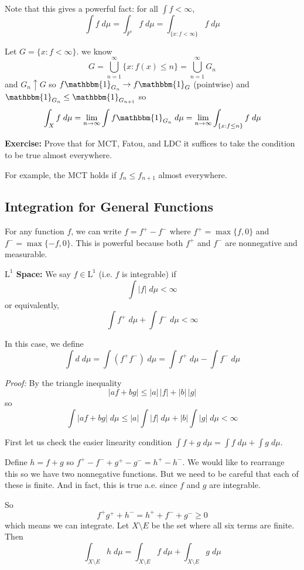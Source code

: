 \documentclass[12pt]{report}
\newcommand{\R}{\mathbb{R}}
\newcommand{\ind}{\mathbbm{1}}
\newcommand{\abs}[1]{\left\vert #1 \right\vert}
\renewcommand{\L}{\text{L}}
\newcommand*{\tbf}[1]{\ifmmode\mathbf{#1}\else\textbf{#1}\fi}
\newenvironment*{tbox}[2][gray]{
    \begin{tcolorbox}[
        parbox=false,
        colback=#1!5!white,
        colframe=#1!75!black,
        breakable,
        title={#2}
    ]}
    {\end{tcolorbox}}
\newenvironment*{exercise}[1][red]{
    \begin{tcolorbox}[
        parbox=false,
        colback=#1!5!white,
        colframe=#1!75!black,
        breakable
    ]}
    {\end{tcolorbox}}
\begin{document}
    Note that this gives a powerful fact: for all $\int f < \infty$, 
    \[\int f\; d\mu = \int_{F^c} f\; d\mu = \int_{\{x: f< \infty\}} f\; d\mu\]

    Let $G = \{x: f < \infty\}$. we know
    \[G = \bigcup_{n=1}^\infty \{x: f(x) \leq n\} = \bigcup_{n=1}^\infty G_n\] 
    and $G_n \uparrow G$ so $f \ind_{G_n} \to f\ind_G$ (pointwise) and $\ind_{G_n} \leq \ind_{G_{n+1}}$ so 
    \[\int_X f \; d\mu = \lim_{n \to \infty} \int f \ind_{G_n} \; d\mu = \lim_{n \to \infty} \int_{\{x: f\leq n\}} f\; d\mu\]

    \begin{exercise}
        \textbf{Exercise:} Prove that for MCT, Fatou, and LDC it suffices to take the condition to be true almost everywhere. 

        For example, the MCT holds if $f_n \leq f_{n+1}$ almost everywhere. 
    \end{exercise}

\subsection*{Integration for General Functions} 
    For any function $f$, we can write $f = f^+ - f^-$ where $f^+ = \max\{f, 0\}$ and $f^- = \max\{-f, 0\}$. This is powerful because both $f^+$ and $f^-$ are nonnegative and measurable. 

    \tbf{$\L^1$ Space:} We say $f \in \L^1$ (i.e. $f$ is integrable) if 
    \[\int \abs f \; d\mu < \infty\]
    or equivalently, 
    \[\int f^+ \; d\mu + \int f^- \; d\mu < \infty\] 
    
    In this case, we define 
    \[\int d \; d\mu = \int(f^+  f^-) \; d\mu = \int f^+ \; d\mu - \int f^- \; d\mu\]

    \begin{tbox}{\textbf{Proposition:} If $f, g \in \L^1$ and $a, b \in \R$, then 
        \begin{enumerate}
            \item $af+ bg \in \L^1$
            \item $\int af + bg \; d\mu = a\int f \; d\mu + b\int g \; d\mu$
        \end{enumerate} }
        \emph{Proof:} By the triangle inequality 
        \[\abs{af  +bg} \leq \abs{a}\, \abs{f} + \abs{b}\, \abs{g}\]
        so 
        \[\int \abs{af + bg} \; d\mu \leq \abs{a} \int \abs{f} \; d\mu + \abs{b} \int \abs{g} \; d\mu < \infty\]

        First let us check the easier linearity condition $\int f + g\; d\mu = \int f\; d\mu + \int g\; d\mu$. 

        Define $h = f + g$ so $f^+ - f^- + g^+ - g^- = h^+ - h^-$. We would like to rearrange this so we have two nonnegative functions. But we need to be careful that each of these is finite. And in fact, this is true a.e. since $f$ and $g$ are integrable.

        So 
        \[f^+ g^+ + h^- = h^+ + f^- + g^- \geq 0\]
        which means we can integrate. Let $X \setminus E$ be the set where all six terms are finite. Then 
        \[\int_{X \setminus E} h \; d\mu = \int_{X \setminus E} f\; d\mu + \int_{X \setminus E} g\; d\mu\]
    \end{tbox}
\end{document}
